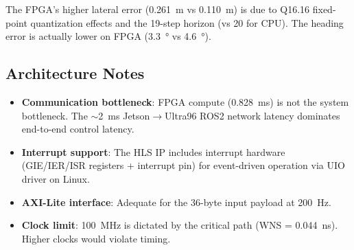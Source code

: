\documentclass[11pt,a4paper]{article}
\begin{document}
The FPGA's higher lateral error (\SI{0.261}{\metre} vs \SI{0.110}{\metre}) is due to Q16.16 fixed-point quantization effects and the 19-step horizon (vs 20 for CPU). The heading error is actually lower on FPGA (\SI{3.3}{\degree} vs \SI{4.6}{\degree}).

\subsection{Architecture Notes}
\begin{itemize}
  \item \textbf{Communication bottleneck}: FPGA compute (\SI{0.828}{\milli\second}) is not the system bottleneck. The $\sim$\SI{2}{\milli\second} Jetson$\to$Ultra96 ROS2 network latency dominates end-to-end control latency.
  \item \textbf{Interrupt support}: The HLS IP includes interrupt hardware (GIE/IER/ISR registers + interrupt pin) for event-driven operation via UIO driver on Linux.
  \item \textbf{AXI-Lite interface}: Adequate for the 36-byte input payload at \SI{200}{\hertz}.
  \item \textbf{Clock limit}: \SI{100}{\mega\hertz} is dictated by the critical path (WNS = \SI{+0.044}{\nano\second}). Higher clocks would violate timing.
\end{itemize}
\end{document}

